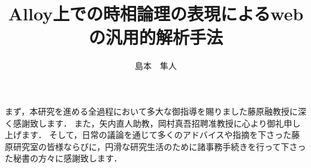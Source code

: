 \documentclass[12pt,a4paper]{jbook}
\title{Alloy上での時相論理の表現によるwebの汎用的解析手法}
\author{島本　隼人}
\begin{document}
\coverpage
\tableofcontents
\listoffigures
\listoftables
\body








\acknowledgement
まず，本研究を進める全過程において多大な御指導を賜りました藤原融教授に深く感謝致します．
また，矢内直人助教，岡村真吾招聘准教授に心より御礼申し上げます．
そして，日常の議論を通じて多くのアドバイスや指摘を下さった藤原研究室の皆様ならびに，円滑な研究生活のために諸事務手続きを行って下さった秘書の方々に感謝致します．


 
\end{document}
